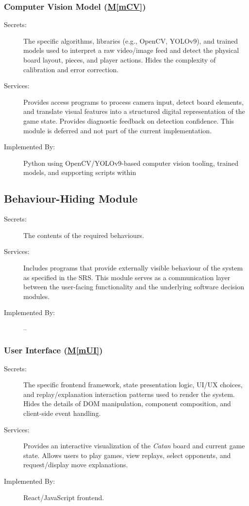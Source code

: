 \documentclass[12pt, titlepage]{article}
\newcommand{\mref}[1]{\hyperref[sec:#1]{M\ref*{#1}}}
\begin{document}
\subsubsection{Computer Vision Model (\mref{mCV})} \label{sec:mCV}
\begin{description}
\item[Secrets:] The specific algorithms, libraries (e.g., OpenCV, YOLOv9), and trained models used to interpret a raw video/image feed and detect the physical board layout, pieces, and player actions.
Hides the complexity of calibration and error correction.
\item[Services:] Provides access programs to process camera input, detect board elements, and translate visual features into a structured digital representation of the game state.
Provides diagnostic feedback on detection confidence.
This module is deferred and not part of the current implementation.
\item[Implemented By:] Python using OpenCV/YOLOv9-based computer vision tooling, trained models, and supporting scripts within \progname{}
\end{description}

\subsection{Behaviour-Hiding Module}
\begin{description}
\item[Secrets:] The contents of the required behaviours.
\item[Services:] Includes programs that provide externally visible behaviour of
the system as specified in the SRS.
This module serves as a communication layer between the user-facing functionality and the underlying software decision modules.
\item[Implemented By:] --
\end{description}

\subsubsection{User Interface (\mref{mUI})} \label{sec:mUI}
\begin{description}
\item[Secrets:] The specific frontend framework, state presentation logic, UI/UX choices, and replay/explanation interaction patterns used to render the system.
Hides the details of DOM manipulation, component composition, and client-side event handling.
\item[Services:] Provides an interactive visualization of the \emph{Catan} board and current game state.
Allows users to play games, view replays, select opponents, and request/display move explanations.
\item[Implemented By:] React/JavaScript frontend.
\end{description}
\end{document}
